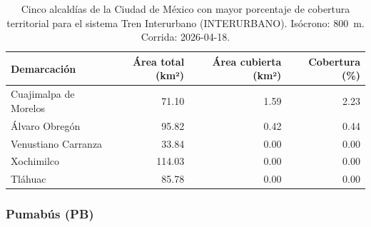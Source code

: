 \begin{table}[H]
    \centering
    \caption[Alcaldías con mayor cobertura de Tren Interurbano (CDMX)]{
    Cinco alcaldías de la Ciudad de México con mayor porcentaje de cobertura
    territorial para el sistema Tren Interurbano (INTERURBANO). Isócrono: 800~m.
    Corrida: 2026-04-18.}
    \label{tab:cobertura-interurbano-cdmx}
    \begin{tabular}{|l|r|r|r|}
        \hline
        \textbf{Demarcación} & \textbf{Área total (km²)} & \textbf{Área cubierta (km²)} & \textbf{Cobertura (\%)} \\
        \hline
        Cuajimalpa de Morelos &  71.10 & 1.59 & 2.23 \\
        Álvaro Obregón        &  95.82 & 0.42 & 0.44 \\
        Venustiano Carranza   &  33.84 & 0.00 & 0.00 \\
        Xochimilco            & 114.03 & 0.00 & 0.00 \\
        Tláhuac               &  85.78 & 0.00 & 0.00 \\
        \hline
    \end{tabular}
\end{table}

\DIFdelbegin {}%

{%
}

\DIFdelend \subsubsection{Pumabús (PB)}
\label{subsubsec:cobertura-pb}

